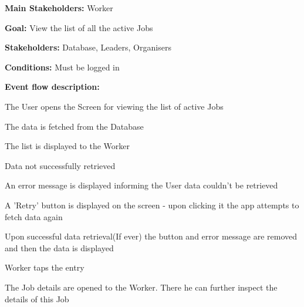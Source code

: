 				\noindent {}
				\begin{packed_item}
					\item \textbf{Main Stakeholders:} Worker
					\item \textbf{Goal:} View the list of all the active Jobs
					\item \textbf{Stakeholders: } Database, Leaders, Organisers
					\item \textbf{Conditions: } Must be logged in
					\item \textbf{Event flow description: }
					\begin{packed_enum}
						\item The User opens the Screen for viewing the list of active Jobs
						\item The data is fetched from the Database
						\item The list is displayed to the Worker
					\end{packed_enum}
					
					\begin{packed_item}
						\item[1.a] Data not successfully retrieved
						\item[] \begin{packed_enum}
							\item An error message is displayed informing the User data couldn't be retrieved
							\item A 'Retry' button is displayed on the screen - upon clicking it the app attempts to fetch data again
							\item Upon successful data retrieval(If ever) the button and error message are removed and then the data is displayed
						\end{packed_enum}
					
						\item[] Worker taps the entry
						\item[] \begin{packed_enum}
							\item The Job details are opened to the Worker. There he can further inspect
							the details of this Job
						\end{packed_enum}
					\end{packed_item}
					
				\end{packed_item}
			
